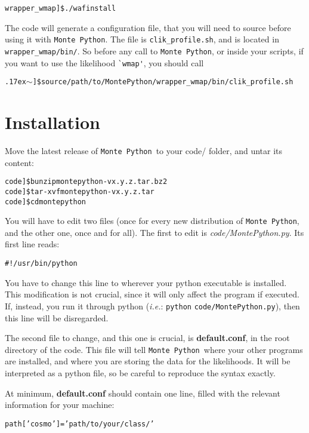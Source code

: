 \documentclass[10pt]{article}
\newcommand{\MP}{\texttt{Monte Python}}
\newcommand{\tild}{\raise.17ex\hbox{$\scriptstyle\mathtt{\sim}$}}
\begin{document}
  \begin{alltt}
    wrapper_wmap]\$ ./waf install
  \end{alltt}

  The code will generate a configuration file, that you will need to source
  before using it with \MP. The file is \verb?clik_profile.sh?, and is located
  in \verb?wrapper_wmap/bin/?. So before any call to \MP, or inside your
  scripts, if you want to use the likelihood \verb?`wmap'?, you should call

  \begin{alltt}
    \tild]\$ source /path/to/MontePython/wrapper_wmap/bin/clik_profile.sh
  \end{alltt}

\newpage
\section{Installation\label{sec:installation}}

  Move the latest release of \MP\, to your code/ folder, and untar its
  content:

  \begin{alltt} 
    code]\$ bunzip montepython-vx.y.z.tar.bz2 
    code]\$ tar -xvf montepython-vx.y.z.tar
    code]\$ cd montepython
  \end{alltt}

 You will have to edit two files (once for every new distribution of \MP, and
 the other one, once and for all). The first to edit is
 \emph{code/MontePython.py}. Its first line reads:

 \begin{alltt}
    #!/usr/bin/python
 \end{alltt}

 You have to change this line to wherever your python executable is installed.
 This modification is not crucial, since it will only affect the program if
 executed. If, instead, you run it through python (\emph{i.e.}: \verb?python?
 \verb?code/MontePython.py?), then this line will be disregarded.

 The second file to change, and this one is crucial, is {\bf default.conf}, in
 the root directory of the code. This file will tell \MP\, where your
 other programs are installed, and where you are storing the data for the
 likelihoods. It will be interpreted as a python file, so be careful to
 reproduce the syntax exactly.

 At minimum, {\bf default.conf} should contain one line, filled with the
 relevant information for your machine:
 \begin{alltt}
   path['cosmo']   = 'path/to/your/class/'
 \end{alltt}
 
\end{document}
